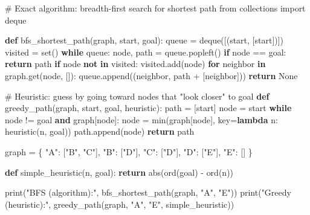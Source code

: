 \documentclass[
  letterpaper,
  DIV=11,
  numbers=noendperiod]{scrreprt}
\newenvironment{Shaded}{\begin{snugshade}}{\end{snugshade}}
\newcommand{\BuiltInTok}[1]{\textcolor[rgb]{0.00,0.23,0.31}{#1}}
\newcommand{\CommentTok}[1]{\textcolor[rgb]{0.37,0.37,0.37}{#1}}
\newcommand{\ControlFlowTok}[1]{\textcolor[rgb]{0.00,0.23,0.31}{\textbf{#1}}}
\newcommand{\ImportTok}[1]{\textcolor[rgb]{0.00,0.46,0.62}{#1}}
\newcommand{\KeywordTok}[1]{\textcolor[rgb]{0.00,0.23,0.31}{\textbf{#1}}}
\newcommand{\NormalTok}[1]{\textcolor[rgb]{0.00,0.23,0.31}{#1}}
\newcommand{\OperatorTok}[1]{\textcolor[rgb]{0.37,0.37,0.37}{#1}}
\newcommand{\StringTok}[1]{\textcolor[rgb]{0.13,0.47,0.30}{#1}}
\newcommand{\VariableTok}[1]{\textcolor[rgb]{0.07,0.07,0.07}{#1}}
\begin{document}
\begin{Shaded}
\begin{Highlighting}[]
\CommentTok{\# Exact algorithm: breadth{-}first search for shortest path}
\ImportTok{from}\NormalTok{ collections }\ImportTok{import}\NormalTok{ deque}

\KeywordTok{def}\NormalTok{ bfs\_shortest\_path(graph, start, goal):}
\NormalTok{    queue }\OperatorTok{=}\NormalTok{ deque([(start, [start])])}
\NormalTok{    visited }\OperatorTok{=} \BuiltInTok{set}\NormalTok{()}
    \ControlFlowTok{while}\NormalTok{ queue:}
\NormalTok{        node, path }\OperatorTok{=}\NormalTok{ queue.popleft()}
        \ControlFlowTok{if}\NormalTok{ node }\OperatorTok{==}\NormalTok{ goal:}
            \ControlFlowTok{return}\NormalTok{ path}
        \ControlFlowTok{if}\NormalTok{ node }\KeywordTok{not} \KeywordTok{in}\NormalTok{ visited:}
\NormalTok{            visited.add(node)}
            \ControlFlowTok{for}\NormalTok{ neighbor }\KeywordTok{in}\NormalTok{ graph.get(node, []):}
\NormalTok{                queue.append((neighbor, path }\OperatorTok{+}\NormalTok{ [neighbor]))}
    \ControlFlowTok{return} \VariableTok{None}

\CommentTok{\# Heuristic: guess by going toward nodes that "look closer" to goal}
\KeywordTok{def}\NormalTok{ greedy\_path(graph, start, goal, heuristic):}
\NormalTok{    path }\OperatorTok{=}\NormalTok{ [start]}
\NormalTok{    node }\OperatorTok{=}\NormalTok{ start}
    \ControlFlowTok{while}\NormalTok{ node }\OperatorTok{!=}\NormalTok{ goal }\KeywordTok{and}\NormalTok{ graph[node]:}
\NormalTok{        node }\OperatorTok{=} \BuiltInTok{min}\NormalTok{(graph[node], key}\OperatorTok{=}\KeywordTok{lambda}\NormalTok{ n: heuristic(n, goal))}
\NormalTok{        path.append(node)}
    \ControlFlowTok{return}\NormalTok{ path}

\NormalTok{graph }\OperatorTok{=}\NormalTok{ \{}
    \StringTok{"A"}\NormalTok{: [}\StringTok{"B"}\NormalTok{, }\StringTok{"C"}\NormalTok{],}
    \StringTok{"B"}\NormalTok{: [}\StringTok{"D"}\NormalTok{],}
    \StringTok{"C"}\NormalTok{: [}\StringTok{"D"}\NormalTok{],}
    \StringTok{"D"}\NormalTok{: [}\StringTok{"E"}\NormalTok{],}
    \StringTok{"E"}\NormalTok{: []}
\NormalTok{\}}

\KeywordTok{def}\NormalTok{ simple\_heuristic(n, goal): }\ControlFlowTok{return} \BuiltInTok{abs}\NormalTok{(}\BuiltInTok{ord}\NormalTok{(goal) }\OperatorTok{{-}} \BuiltInTok{ord}\NormalTok{(n))}

\BuiltInTok{print}\NormalTok{(}\StringTok{"BFS (algorithm):"}\NormalTok{, bfs\_shortest\_path(graph, }\StringTok{"A"}\NormalTok{, }\StringTok{"E"}\NormalTok{))}
\BuiltInTok{print}\NormalTok{(}\StringTok{"Greedy (heuristic):"}\NormalTok{, greedy\_path(graph, }\StringTok{"A"}\NormalTok{, }\StringTok{"E"}\NormalTok{, simple\_heuristic))}
\end{Highlighting}
\end{Shaded}
\end{document}
